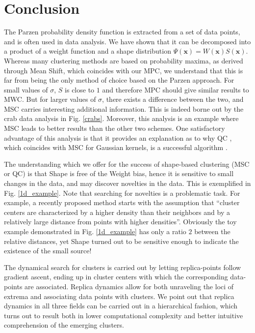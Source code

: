\documentclass[preprint,12pt]{elsarticle}
\begin{document}
\section{Conclusion}
\label{conclusion}
The Parzen probability density function is extracted from a set of data points, and is often used in data analysis. We have shown that it can be decomposed into a product of a weight function and a shape distribution $\Psi\left(\mathbf{x}\right)=W\left(\mathbf{x}\right)S\left(\mathbf{x}\right)$. Whereas many clustering methods are based on probability maxima, as derived through Mean Shift, which coincides with our MPC, we understand that this is far from being the only method of choice based on the Parzen approach. For small values of $\sigma$, $S$ is close to $1$ and therefore MPC should give similar results to MWC. But for larger values of $\sigma$, there exists a difference between the two, and MSC carries interesting additional information. This is indeed borne out by the crab data analysis in Fig. \ref{crabs}. Moreover, this analysis is an example where MSC leads to better results than the other two schemes. One satisfactory advantage of this analysis is that it provides an explanation as to why QC \cite{horn2001}, which coincides with MSC for Gaussian kernels, is a successful algorithm \cite{scott2017data,cui2016analog,liu2016analyzing}.

The understanding which we offer for the success of shape-based clustering (MSC or QC) is that Shape is free of the Weight bias, hence it is sensitive to small changes in the data, and may discover novelties in the data. This is exemplified in Fig. \ref{1d_example}. Note that searching for novelties is a problematic task. For example, a recently proposed method \cite{rodriguez2014clustering} starts with the assumption that ``cluster centers are characterized by a higher density than their neighbors and by a relatively large distance from points with higher densities''. Obviously the toy example demonstrated in Fig. \ref{1d_example} has only a ratio $2$ between the relative distances, yet Shape turned out to be sensitive enough to indicate the existence of the small source!

The dynamical search for clusters is carried out by letting replica-points follow gradient ascent, ending up in cluster centers with which the corresponding data-points are associated. Replica dynamics allow for both unraveling the loci of extrema and associating data points with clusters. We point out that replica dynamics in all three fields can be carried out in a hierarchical fashion, which turns out to result both in lower computational complexity and better intuitive comprehension of the emerging clusters.
\end{document}
